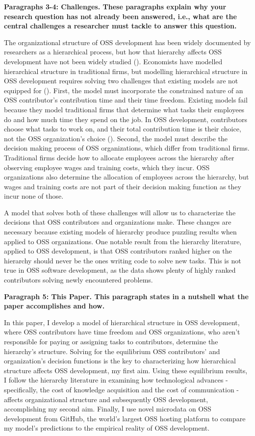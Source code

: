 \documentclass[source/paper/main.tex]{subfiles}
\begin{document}
\textbf{Paragraphs 3-4: Challenges. These paragraphs explain why your research question has not already been answered, i.e., what are the central challenges a researcher must tackle to answer this question.}

\qquad The organizational structure of OSS development has been widely documented by researchers as a hierarchical process, but how that hierarchy affects OSS development have not been widely studied (\cite{crowston_hierarchy_2006}). Economists have modelled hierarchical structure in traditional firms, but modelling hierarchical structure in OSS development requires solving two challenges that existing models are not equipped for (\cite{garicano_hierarchies_2000}). First, the model must incorporate the constrained nature of an OSS contributor's contribution time and their time freedom. Existing models fail because they model traditional firms that determine what tasks their employees do and how much time they spend on the job. In OSS development, contributors choose what tasks to work on, and their total contribution time is their choice, not the OSS organization's choice (\cite{lerner_simple_2002}). Second, the model must describe the decision making process of OSS organizations, which differ from traditional firms. Traditional firms decide how to allocate employees across the hierarchy after observing employee wages and training costs, which they incur. OSS organizations also determine the allocation of employees across the hierarchy, but wages and training costs are not part of their decision making function as they incur none of those. 

\qquad A model that solves both of these challenges will allow us to characterize the decisions that OSS contributors and organizations make. These changes are necessary because existing models of hierarchy produce puzzling results when applied to OSS organizations. One notable result from the hierarchy literature, applied to OSS development, is that OSS contributors ranked higher on the hierarchy should never be the ones writing code to solve new tasks. This is not true in OSS software development, as the data shows plenty of highly ranked contributors solving newly encountered problems. 


\textbf{Paragraph 5: This Paper. This paragraph states in a nutshell what the paper accomplishes and how. }

In this paper, I develop a model of hierarchical structure in OSS development, where OSS contributors have time freedom and OSS organizations, who aren't responsible for paying or assigning tasks to contributors, determine the hierarchy's structure. Solving for the equilibrium OSS contributors' and organization's decision functions is the key to characterizing how hierarchical structure affects OSS development, my first aim. Using these equilibrium results, I follow the hierarchy literature in examining how technological advances - specifically, the cost of knowledge acquisition and the cost of communication - affects organizational structure and subsequently OSS development, accomplishing my second aim. Finally, I use novel microdata on OSS development from GitHub, the world's largest OSS hosting platform to compare my model's predictions to the empirical reality of OSS development. 
\end{document}
